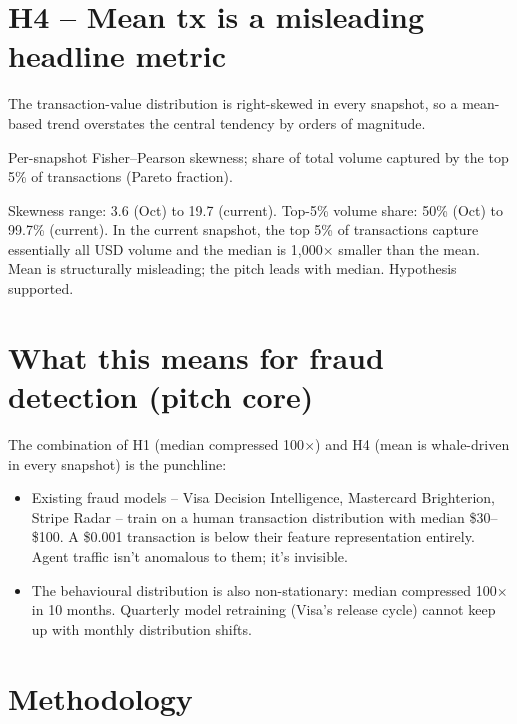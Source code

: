 \documentclass[11pt]{article}
\begin{document}
\section{H4 -- Mean tx is a misleading headline metric}

\begin{hypothesis}
The transaction-value distribution is right-skewed in every snapshot, so a
mean-based trend overstates the central tendency by orders of magnitude.
\end{hypothesis}

\begin{experiment}
Per-snapshot Fisher--Pearson skewness; share of total volume captured by
the top 5\% of transactions (Pareto fraction).
\end{experiment}

\begin{result}
Skewness range: 3.6 (Oct) to 19.7 (current). Top-5\% volume share: 50\% (Oct)
to 99.7\% (current). In the current snapshot, the top 5\% of transactions
capture essentially all USD volume and the median is 1{,}000$\times$ smaller
than the mean. Mean is structurally misleading; the pitch leads with median.
Hypothesis supported.
\end{result}

\section{What this means for fraud detection (pitch core)}

The combination of H1 (median compressed 100$\times$) and H4 (mean is whale-driven
in every snapshot) is the punchline:

\begin{itemize}
  \item Existing fraud models -- Visa Decision Intelligence, Mastercard
    Brighterion, Stripe Radar -- train on a human transaction distribution
    with median \$30--\$100. A \$0.001 transaction is below their feature
    representation entirely. Agent traffic isn't anomalous to them; it's
    invisible.
  \item The behavioural distribution is also non-stationary: median
    compressed 100$\times$ in 10 months. Quarterly model retraining (Visa's
    release cycle) cannot keep up with monthly distribution shifts.
\end{itemize}

\section{Methodology}
\end{document}
